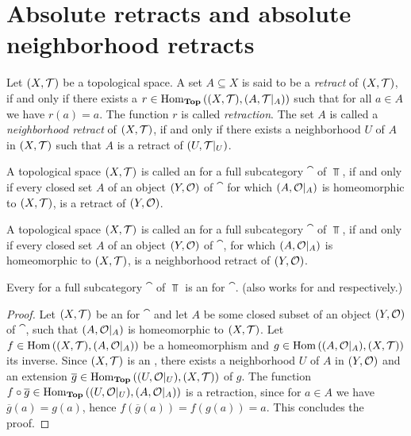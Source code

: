 \section{Absolute retracts and absolute neighborhood retracts}

\begin{definition}
	Let $\tspace$ be a topological space. A set $A \subseteq X$ is said to be a \textit{retract} of $\tspace$, if and only if there exists a $r \in \Hom_\Top\pbraces{\tspace, \reltspace}$ such that for all $a \in A$ we have $r(a) = a$. The function $r$ is called \textit{retraction}. The set $A$ is called a \textit{neighborhood retract} of $\tspace$, if and only if there exists a neighborhood $U$ of $A$ in $\tspace$ such that $A$ is a retract of $\reltspace[U][T]$. 
\end{definition}

\begin{definition}
	A topological space $\tspace$ is called an \textit{\ar} for a full subcategory $\cat$ of $\Top$, if and only if every closed set $A$ of an object $\tspace[Y][O]$ of $\cat$ for which ${\left ( A, \mathcal{O}\vert_A \right )}$ is homeomorphic to $\tspace$, is a retract of $\tspace[Y][O]$.    
\end{definition}

\begin{definition}
	A topological space $\tspace$ is called an \textit{\anr} for a full subcategory $\cat$ of $\Top$, if and only if every closed set $A$ of an object $\tspace[Y][O]$ of $\cat$, for which ${\left ( A, \mathcal{O}\vert_A \right )}$ is homeomorphic to $\tspace$, is a neighborhood retract of $\tspace[Y][O]$.    
\end{definition}

\begin{theorem}
	Every \ane for a full subcategory $\cat$ of $\Top$ is an \anr for $\cat$. (also works for \aex and \ar respectively.)
\end{theorem}
\begin{proof}
	Let $\tspace$ be an \ane for $\cat$ and let $A$ be some closed subset of an object $\tspace[Y][O]$ of $\cat$, such that ${\left ( A, \mathcal{O}\vert_A \right )}$ is homeomorphic to $\tspace$. Let $f \in \Hom\pbraces{\tspace, \reltspace[A][O]}$ be a homeomorphism and $g \in \Hom\pbraces{\reltspace[A][O], \tspace}$ its inverse. Since $\tspace$ is an \ane, there exists a neighborhood $U$ of $A$ in $\tspace[Y][O]$ and an extension $\overline{g} \in \Hom_\Top\pbraces{\reltspace[U][O], \tspace}$ of $g$. The function $f \circ \overline{g} \in \operatorname{Hom}_{\mathbf{Top}}{\left ( {\left ( U, \mathcal{O}\vert_U \right )}, {\left ( A, \mathcal{O}\vert_A \right )} \right )}$ is a retraction, since for $a \in A$ we have $\overline{g}(a) = g(a)$, hence $f(\overline{g}(a)) = f(g(a)) = a$. This concludes the proof. 
\end{proof}

